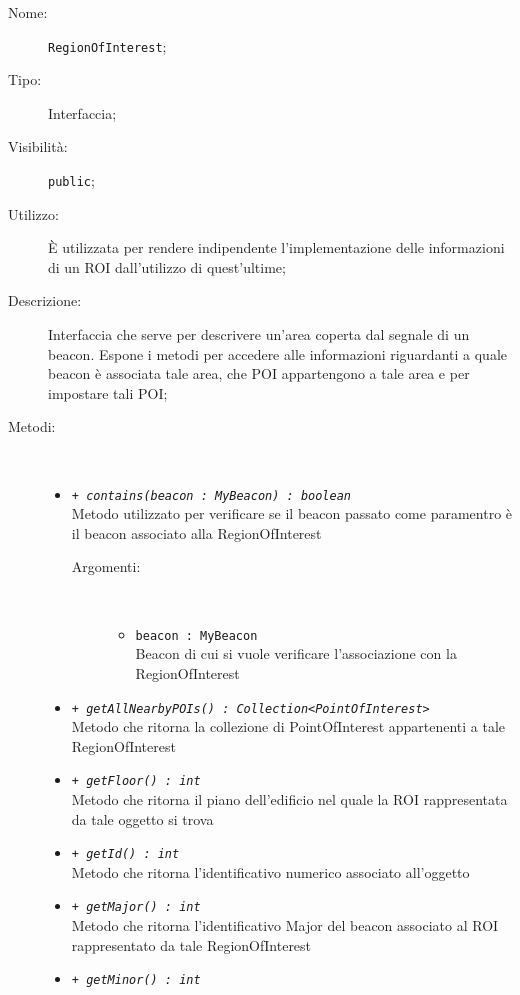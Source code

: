 \documentclass[../DefinizioneDiProdotto.tex]{subfiles}
\begin{document}
    \begin{description}
\item[Nome:] \texttt{RegionOfInterest};
\item[Tipo:] Interfaccia;
\item[Visibilità:] \texttt{public};
\item[Utilizzo:] È utilizzata per rendere indipendente l'implementazione delle informazioni di un ROI dall'utilizzo di quest'ultime;
\item[Descrizione:] Interfaccia che serve per descrivere un'area coperta dal segnale di un beacon. Espone i metodi per accedere alle informazioni riguardanti a quale beacon è associata tale area, che POI appartengono a tale area e per impostare tali POI;
\item[Metodi:] \
\begin{itemize}
\item \texttt{+ \textit{contains(beacon : MyBeacon) : boolean}}\\
Metodo utilizzato per verificare se il beacon passato come paramentro è il beacon associato alla RegionOfInterest
 \begin{description}
\item[Argomenti:] \
\begin{itemize}
\item \texttt{beacon : MyBeacon}\\
Beacon di cui si vuole verificare l'associazione con la RegionOfInterest\end{itemize}
\end{description}
\item \texttt{+ \textit{getAllNearbyPOIs() : Collection<PointOfInterest>}}\\
Metodo che ritorna la collezione di PointOfInterest appartenenti a tale RegionOfInterest
 \item \texttt{+ \textit{getFloor() : int}}\\
Metodo che ritorna il piano dell'edificio nel quale la ROI rappresentata da tale oggetto si trova
 \item \texttt{+ \textit{getId() : int}}\\
Metodo che ritorna l'identificativo numerico associato all'oggetto
 \item \texttt{+ \textit{getMajor() : int}}\\
Metodo che ritorna l'identificativo Major del beacon associato al ROI rappresentato da tale RegionOfInterest
 \item \texttt{+ \textit{getMinor() : int}}\\

\end{itemize}
\end{description}
\end{document}
